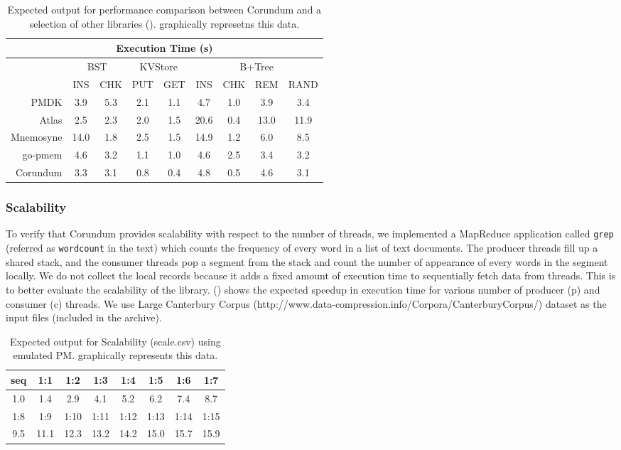 {\begin{table}
  \center
  \small
  \setlength\tabcolsep{1.5pt}
  \caption{Expected output for performance comparison between Corundum and a selection of other libraries ().  graphically represetns this data.}
  \label{tbl:perf}
  \begin{tabular}{|r|c|c|c|c|c|c|c|c|} \hline
    \multicolumn{9}{|c|}{Execution Time (s)}	\\ \hline						
    & \multicolumn{2}{|c|}{BST}	& \multicolumn{2}{|c|}{KVStore}&\multicolumn{4}{|c|}{B+Tree}	     \\\hline	
    & INS&CHK&PUT&GET&INS&CHK&REM&RAND           \\\hline
    PMDK     &3.9&5.3&2.1&1.1&4.7&1.0&3.9&3.4    \\\hline
    Atlas    &2.5&2.3&2.0&1.5&20.6&0.4&13.0&11.9 \\\hline
    Mnemosyne&14.0&1.8&2.5&1.5&14.9&1.2&6.0&8.5  \\\hline
    go-pmem  &4.6&3.2&1.1&1.0&4.6&2.5&3.4&3.2    \\\hline
    Corundum &3.3&3.1&0.8&0.4&4.8&0.5&4.6&3.1    \\\hline
  \end{tabular}
\end{table}


\subsubsection{Scalability}
To verify that Corundum provides scalability with respect to the number of threads, we implemented a MapReduce application called \verb+grep+ (referred as \verb+wordcount+ in the text) which counts the frequency of every word in a list of text documents. The producer threads fill up a shared stack, and the consumer threads pop a segment from the stack and count the number of appearance of every words in the segment locally. We do not collect the local records because it adds a fixed amount of execution time to sequentially fetch data from threads. This is to better evaluate the scalability of the library.  () shows the expected speedup in execution time for various number of producer (p) and consumer (c) threads. We use Large Canterbury Corpus (http://www.data-compression.info/Corpora/CanterburyCorpus/) dataset as the input files (included in the archive).

\begin{table}[!ht]
  \caption{Expected output for Scalability (scale.csv) using emulated PM.  graphically represents this data.}
  \label{tbl:scale}
  \begin{tabular}{|c|c|c|c|c|c|c|c|} \hline
    seq&1:1&1:2&1:3&1:4&1:5&1:6&1:7\\\hline
    1.0&1.4&2.9&4.1&5.2&6.2&7.4&8.7\\\hline\hline
    1:8&1:9&1:10&1:11&1:12&1:13&1:14&1:15\\\hline
    9.5&11.1&12.3&13.2&14.2&15.0&15.7&15.9\\\hline
  \end{tabular}
\end{table}


}
